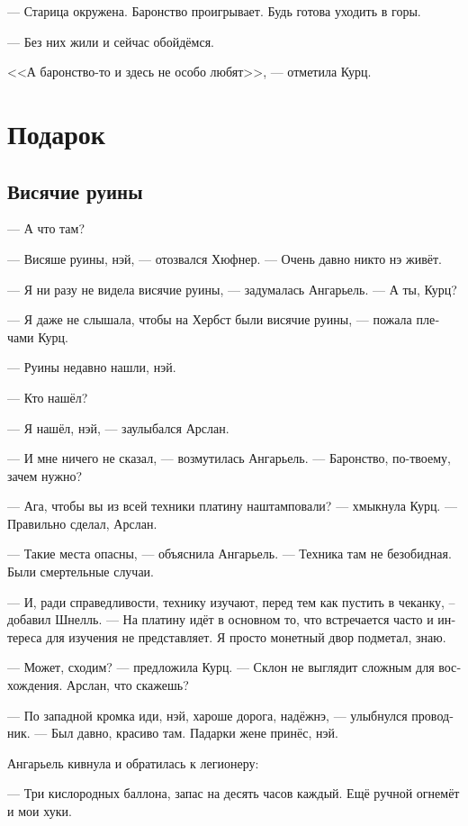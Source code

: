 \documentclass[a4paper,12pt,fleqn]{book}\usepackage{cooltooltips}\usepackage{polyglossia}\setdefaultlanguage[babelshorthands=true]{russian}\setotherlanguage{english}\defaultfontfeatures{Ligatures=TeX,Mapping=tex-text} \usepackage{xcolor}\definecolor{lightgray}{HTML}{bbbbbb}\color{lightgray}\newcommand{\ml}[3]{\textenglish{\textcolor{black}{#3}}}
\begin{document}
--- Старица окружена.
Баронство проигрывает.
Будь готова уходить в горы.

--- Без них жили и сейчас обойдёмся.

<<А баронство-то и здесь не особо любят>>, --- отметила Курц.


\chapter{Подарок}

\section{Висячие руины}

--- А что там?

--- Висяше руины, нэй, --- отозвался Хюфнер.
--- Очень давно никто нэ живёт.

--- Я ни разу не видела висячие руины, --- задумалась Ангарьель.
--- А ты, Курц?

--- Я даже не слышала, чтобы на Хербст были висячие руины, --- пожала плечами Курц.

--- Руины недавно нашли, нэй.

--- Кто нашёл?

--- Я нашёл, нэй, --- заулыбался Арслан.

--- И мне ничего не сказал, --- возмутилась Ангарьель.
--- Баронство, по-твоему, зачем нужно?

--- Ага, чтобы вы из всей техники платину наштамповали? --- хмыкнула Курц.
--- Правильно сделал, Арслан.

--- Такие места опасны, --- объяснила Ангарьель.
--- Техника там не безобидная.
Были смертельные случаи.

--- И, ради справедливости, технику изучают, перед тем как пустить в чеканку, -- добавил Шнелль.
--- На платину идёт в основном то, что встречается часто и интереса для изучения не представляет.
Я просто монетный двор подметал, знаю.

--- Может, сходим? --- предложила Курц.
--- Склон не выглядит сложным для восхождения.
Арслан, что скажешь?

--- По западной кромка иди, нэй, хароше дорога, надёжнэ, --- улыбнулся проводник.
--- Был давно, красиво там.
Падарки жене принёс, нэй.

Ангарьель кивнула и обратилась к легионеру:

--- Три кислородных баллона, запас на десять часов каждый.
Ещё ручной огнемёт и мои хуки.
\end{document}
